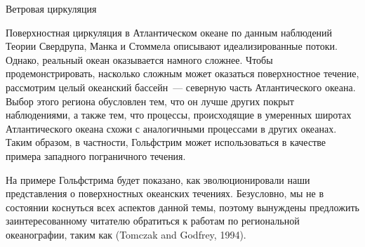 \begin{chapter}{Ветровая циркуляция}
\begin{section}{Поверхностная циркуляция в Атлантическом океане по данным наблюдений}
Теории Свердрупа, Манка и Стоммела описывают идеализированные потоки. Однако,
реальный океан оказывается намного сложнее. Чтобы продемонстрировать, насколько
сложным может оказаться поверхностное течение, рассмотрим целый океанский
бассейн~--- северную часть Атлантического океана. Выбор этого региона 
обусловлен тем, что он лучше других покрыт наблюдениями, а также тем,
что процессы, происходящие в умеренных широтах Атлантического океана схожи
с аналогичными процессами в других океанах. Таким образом, в частности, 
Гольфстрим может использоваться в качестве примера западного пограничного
течения.
%

На примере Гольфстрима будет показано, 
как эволюционировали наши представления о поверхностных океанских течениях.
Безусловно, мы не в состоянии коснуться всех аспектов данной темы, поэтому
вынуждены предложить заинтересованному читателю обратиться к работам по
региональной океанографии, таким как (Tomczak and Godfrey, 1994).
%


\end{section}
\end{chapter}
